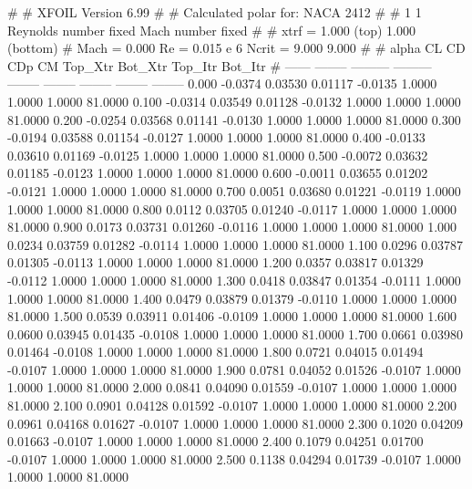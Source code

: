 #  
#       XFOIL         Version 6.99
#  
# Calculated polar for: NACA 2412                                       
#  
# 1 1 Reynolds number fixed          Mach number fixed         
#  
# xtrf =   1.000 (top)        1.000 (bottom)  
# Mach =   0.000     Re =     0.015 e 6     Ncrit =   9.000  9.000
#  
#   alpha    CL        CD       CDp       CM     Top_Xtr  Bot_Xtr  Top_Itr  Bot_Itr
#  ------ -------- --------- --------- -------- -------- -------- -------- --------
   0.000  -0.0374   0.03530   0.01117  -0.0135   1.0000   1.0000   1.0000  81.0000
   0.100  -0.0314   0.03549   0.01128  -0.0132   1.0000   1.0000   1.0000  81.0000
   0.200  -0.0254   0.03568   0.01141  -0.0130   1.0000   1.0000   1.0000  81.0000
   0.300  -0.0194   0.03588   0.01154  -0.0127   1.0000   1.0000   1.0000  81.0000
   0.400  -0.0133   0.03610   0.01169  -0.0125   1.0000   1.0000   1.0000  81.0000
   0.500  -0.0072   0.03632   0.01185  -0.0123   1.0000   1.0000   1.0000  81.0000
   0.600  -0.0011   0.03655   0.01202  -0.0121   1.0000   1.0000   1.0000  81.0000
   0.700   0.0051   0.03680   0.01221  -0.0119   1.0000   1.0000   1.0000  81.0000
   0.800   0.0112   0.03705   0.01240  -0.0117   1.0000   1.0000   1.0000  81.0000
   0.900   0.0173   0.03731   0.01260  -0.0116   1.0000   1.0000   1.0000  81.0000
   1.000   0.0234   0.03759   0.01282  -0.0114   1.0000   1.0000   1.0000  81.0000
   1.100   0.0296   0.03787   0.01305  -0.0113   1.0000   1.0000   1.0000  81.0000
   1.200   0.0357   0.03817   0.01329  -0.0112   1.0000   1.0000   1.0000  81.0000
   1.300   0.0418   0.03847   0.01354  -0.0111   1.0000   1.0000   1.0000  81.0000
   1.400   0.0479   0.03879   0.01379  -0.0110   1.0000   1.0000   1.0000  81.0000
   1.500   0.0539   0.03911   0.01406  -0.0109   1.0000   1.0000   1.0000  81.0000
   1.600   0.0600   0.03945   0.01435  -0.0108   1.0000   1.0000   1.0000  81.0000
   1.700   0.0661   0.03980   0.01464  -0.0108   1.0000   1.0000   1.0000  81.0000
   1.800   0.0721   0.04015   0.01494  -0.0107   1.0000   1.0000   1.0000  81.0000
   1.900   0.0781   0.04052   0.01526  -0.0107   1.0000   1.0000   1.0000  81.0000
   2.000   0.0841   0.04090   0.01559  -0.0107   1.0000   1.0000   1.0000  81.0000
   2.100   0.0901   0.04128   0.01592  -0.0107   1.0000   1.0000   1.0000  81.0000
   2.200   0.0961   0.04168   0.01627  -0.0107   1.0000   1.0000   1.0000  81.0000
   2.300   0.1020   0.04209   0.01663  -0.0107   1.0000   1.0000   1.0000  81.0000
   2.400   0.1079   0.04251   0.01700  -0.0107   1.0000   1.0000   1.0000  81.0000
   2.500   0.1138   0.04294   0.01739  -0.0107   1.0000   1.0000   1.0000  81.0000
